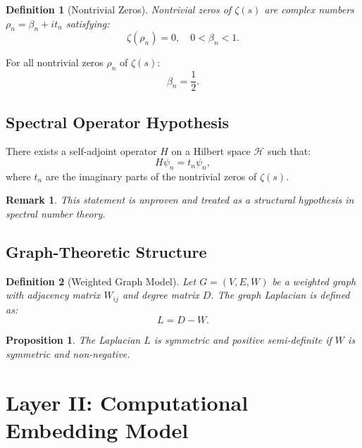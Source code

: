 \documentclass[11pt]{article}
\newtheorem{definition}{Definition}
\newtheorem{proposition}{Proposition}
\newtheorem{remark}{Remark}
\begin{document}
\begin{definition}[Nontrivial Zeros]
Nontrivial zeros of $\zeta(s)$ are complex numbers $\rho_n = \beta_n + i t_n$ satisfying:
\[
\zeta(\rho_n) = 0, \quad 0 < \beta_n < 1.
\]
\end{definition}

\begin{conjecture}
For all nontrivial zeros $\rho_n$ of $\zeta(s)$:
\[
\beta_n = \frac{1}{2}.
\]
\end{conjecture}

\subsection{Spectral Operator Hypothesis}

\begin{conjecture}
There exists a self-adjoint operator $H$ on a Hilbert space $\mathcal{H}$ such that:
\[
H \psi_n = t_n \psi_n,
\]
where $t_n$ are the imaginary parts of the nontrivial zeros of $\zeta(s)$.
\end{conjecture}

\begin{remark}
This statement is unproven and treated as a structural hypothesis in spectral number theory.
\end{remark}

\subsection{Graph-Theoretic Structure}

\begin{definition}[Weighted Graph Model]
Let $G = (V, E, W)$ be a weighted graph with adjacency matrix $W_{ij}$ and degree matrix $D$. The graph Laplacian is defined as:
\[
L = D - W.
\]
\end{definition}

\begin{proposition}
The Laplacian $L$ is symmetric and positive semi-definite if $W$ is symmetric and non-negative.
\end{proposition}

\section{Layer II: Computational Embedding Model}
\end{document}
